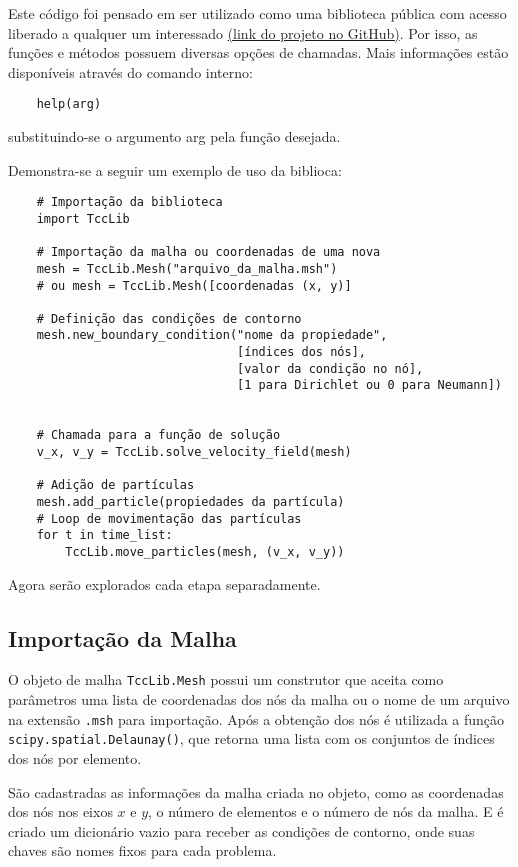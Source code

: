 Este código foi pensado em ser utilizado como uma biblioteca pública com acesso liberado a qualquer um interessado \href{https://github.com/encarvlucas/LucasCarvalhoTCC}{(link do projeto no GitHub)}.
Por isso, as funções e métodos possuem diversas opções de chamadas.
Mais informações estão disponíveis através do comando interno: \begin{verbatim}
    help(arg)
\end{verbatim}
substituindo-se o argumento arg pela função desejada.

Demonstra-se a seguir um exemplo de uso da biblioca:
\begin{verbatim}
    # Importação da biblioteca
    import TccLib

    # Importação da malha ou coordenadas de uma nova
    mesh = TccLib.Mesh("arquivo_da_malha.msh")
    # ou mesh = TccLib.Mesh([coordenadas (x, y)]

    # Definição das condições de contorno
    mesh.new_boundary_condition("nome da propiedade",
                                [índices dos nós], 
                                [valor da condição no nó],
                                [1 para Dirichlet ou 0 para Neumann])


    # Chamada para a função de solução
    v_x, v_y = TccLib.solve_velocity_field(mesh)

    # Adição de partículas
    mesh.add_particle(propiedades da partícula)
    # Loop de movimentação das partículas
    for t in time_list:
        TccLib.move_particles(mesh, (v_x, v_y))
\end{verbatim}

Agora serão explorados cada etapa separadamente.

\subsection{\textbf{Importação da Malha}}
O objeto de malha \verb|TccLib.Mesh| possui um construtor que aceita como parâmetros uma lista de coordenadas dos nós da malha ou o nome de um arquivo na extensão \verb|.msh| para importação.
Após a obtenção dos nós é utilizada a função \verb|scipy.spatial.Delaunay()|, que retorna uma lista com os conjuntos de índices dos nós por elemento.

São cadastradas as informações da malha criada no objeto, como as coordenadas dos nós nos eixos $x$ e $y$, o número de elementos e o número de nós da malha.
E é criado um dicionário vazio para receber as condições de contorno, onde suas chaves são nomes fixos para cada problema.

